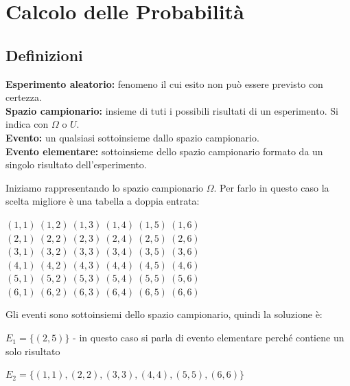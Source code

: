 \documentclass{article}     %
\begin{document}
    \section{Calcolo delle Probabilità}
        \subsection{Definizioni}
            \textbf{Esperimento aleatorio:} fenomeno il cui esito non può essere previsto con certezza.\\
            \textbf{Spazio campionario:} insieme di tuti i possibili risultati di un esperimento. Si indica con $\Omega$ o $U$.\\
            \textbf{Evento:} un qualsiasi sottoinsieme dallo spazio campionario.\\
            \textbf{Evento elementare:} sottoinsieme dello spazio campionario formato da un singolo risultato   dell'esperimento.
            \begin{ex}

            Iniziamo rappresentando lo spazio campionario $\Omega$. Per farlo in questo caso la scelta migliore è una tabella a doppia entrata:
            \begin{center}
                \((1,1)~(1,2)~(1,3)~(1,4)~(1,5)~(1,6)\)\\
                \((2,1)~(2,2)~(2,3)~(2,4)~(2,5)~(2,6)\)\\
                \((3,1)~(3,2)~(3,3)~(3,4)~(3,5)~(3,6)\)\\
                \((4,1)~(4,2)~(4,3)~(4,4)~(4,5)~(4,6)\)\\
                \((5,1)~(5,2)~(5,3)~(5,4)~(5,5)~(5,6)\)\\
                \((6,1)~(6,2)~(6,3)~(6,4)~(6,5)~(6,6)\)\\
            \end{center}

            Gli eventi sono sottoinsiemi dello spazio campionario, quindi la soluzione è:

            $E_1=\{(2,5)\}$ - in questo caso si parla di evento elementare perché contiene un solo risultato

            $E_2=\{(1,1), (2,2), (3,3), (4,4), (5,5), (6,6)\}$
        \end{ex} 
\end{document}
